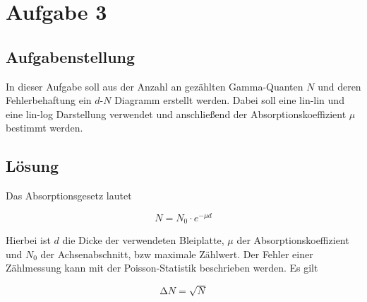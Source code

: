 \section{Aufgabe 3}
\subsection{Aufgabenstellung}
In dieser Aufgabe soll aus der Anzahl an gezählten Gamma-Quanten $N$ und deren Fehlerbehaftung ein $d$-$N$ Diagramm erstellt werden.
Dabei soll eine lin-lin und eine lin-log Darstellung verwendet und anschließend der Absorptionskoeffizient $\mu$ bestimmt werden.
\subsection{Lösung}
Das Absorptionsgesetz lautet

\begin{equation}
N = N_{0} \cdot e^{- \mu d}
\label{eqn:absorptionsges}
\end{equation}
\begin{flushleft}
Hierbei ist $d$ die Dicke der verwendeten Bleiplatte, $\mu$ der Absorptionskoeffizient und $N_{0}$ der Achsenabschnitt, bzw maximale Zählwert.
Der Fehler einer Zählmessung kann mit der Poisson-Statistik beschrieben werden. Es gilt
\end{flushleft}

\begin{equation}
\increment N = \sqrt{N}
\label{eqn:Poissonvert}
\end{equation}


